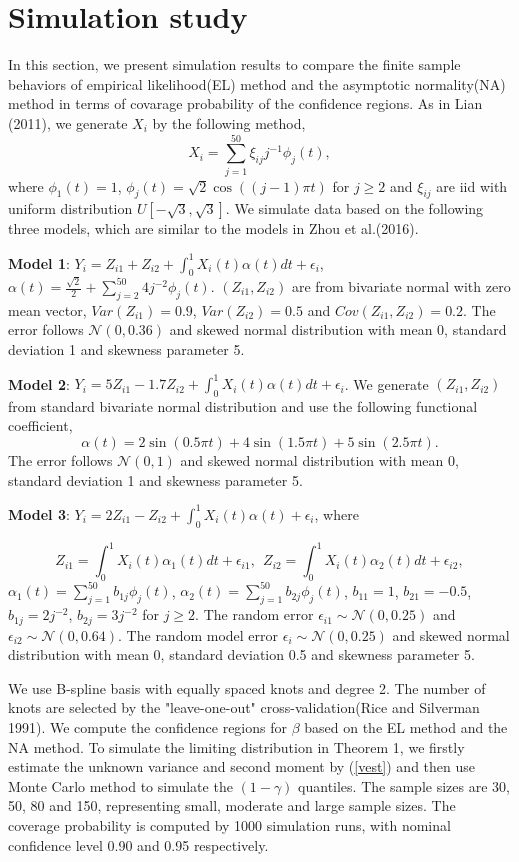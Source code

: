 \documentclass[preprint,12pt]{elsarticle}
\begin{document}
	
	
	
	\section{Simulation study}
	In this section, we present simulation results to compare the finite sample behaviors of empirical likelihood(EL) method and the asymptotic normality(NA) method in terms of covarage probability of the confidence regions. 
	As in Lian (2011), we generate $X_i$ by the following method,
	\[X_i=\sum_{j=1}^{50}\xi_{ij}j^{-1}\phi_j(t),\]
	where $\phi_1(t)=1$, $\phi_j(t)=\sqrt{2}\cos((j-1)\pi t)$ for $j\geq2$ and $\xi_{ij}$ are iid with uniform distribution $U[-\sqrt{3},\sqrt{3}]$. We simulate data based on the following three models, which are similar to  the models in Zhou et al.(2016).
	
	{\bf Model 1}: $Y_i=Z_{i1}+Z_{i2}+\int_{0}^{1}X_i(t)\alpha(t)dt+\epsilon_i$, $\alpha(t)=\frac{\sqrt{2}}{2}+\sum_{j=2}^{50}4j^{-2}\phi_j(t)$. $(Z_{i1}, Z_{i2})$ are from bivariate normal with zero mean vector, $Var(Z_{i1})=0.9$, $Var(Z_{i2})=0.5$ and $Cov(Z_{i1}, Z_{i2})=0.2$. The error follows $\mathcal{N}(0,0.36)$ and skewed normal distribution with mean 0, standard deviation 1 and skewness parameter 5. 
	
	
	{\bf Model 2}: $Y_i=5Z_{i1}-1.7Z_{i2}+\int_{0}^{1}X_i(t)\alpha(t)dt+\epsilon_i$. We generate $(Z_{i1}, Z_{i2})$ from standard bivariate normal distribution and use the following functional coefficient,
	\[\alpha(t)=2\sin(0.5\pi t)+4\sin(1.5\pi t)+5\sin(2.5\pi t).\]
	The error follows $\mathcal{N}(0,1)$ and skewed normal distribution with mean 0, standard deviation 1 and skewness parameter 5. 
	
	
	{\bf Model 3}: $Y_i=2Z_{i1}-Z_{i2}+\int_0^1X_i(t)\alpha(t)+\epsilon_i$, where
	
	\[Z_{i1}=\int_0^1X_i(t)\alpha_1(t)dt+\epsilon_{i1},\ \ Z_{i2}=\int_0^1X_i(t)\alpha_2(t)dt+
	\epsilon_{i2},\]
	$\alpha_1(t)=\sum_{j=1}^{50}b_{1j}\phi_j(t)$, $\alpha_2(t)=\sum_{j=1}^{50}b_{2j}\phi_j(t)$, $b_{11}=1$, $b_{21}=-0.5$, $b_{1j}=2j^{-2}$, $b_{2j}=3j^{-2}$ for $j\geq2$. The random error $\epsilon_{i1}\sim \mathcal{N}(0, 0.25)$ and $\epsilon_{i2}\sim \mathcal{N}(0,0.64)$. The random model error $\epsilon_i\sim \mathcal{N}(0, 0.25)$ and skewed normal distribution with mean 0, standard deviation 0.5 and skewness parameter 5. 
	 
	We use B-spline basis with equally spaced knots and degree 2. The number of knots are selected by the "leave-one-out" cross-validation(Rice and Silverman 1991). We compute the confidence regions for $\beta$ based on the EL method and the NA method. To simulate the limiting distribution in Theorem 1, we firstly estimate the unknown variance and second moment by (\ref{vest}) and then use Monte Carlo method to simulate the $(1-\gamma)$ quantiles. The sample sizes are 30, 50, 80 and 150, representing small, moderate and large sample sizes. The coverage probability is computed by 1000 simulation runs, with nominal confidence level 0.90 and 0.95 respectively. 
	
\end{document}
